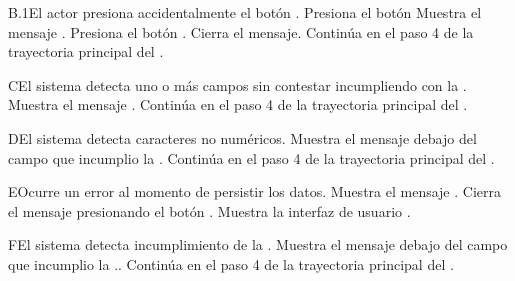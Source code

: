 \begin{UCtrayectoriaA}{B.1}{El actor presiona accidentalmente el botón .}
	\UCpaso[\UCactor] Presiona el botón 
	\UCpaso Muestra el mensaje .
	\UCpaso[\UCactor] Presiona el botón .
	\UCpaso Cierra el mensaje.
	\UCpaso Continúa en el paso 4 de la trayectoria principal del .
\end{UCtrayectoriaA}

\begin{UCtrayectoriaA}{C}{El sistema detecta uno o más campos sin contestar incumpliendo con la .}
	\UCpaso Muestra el mensaje .
	\UCpaso Continúa en el paso 4 de la trayectoria principal del .
\end{UCtrayectoriaA}

\begin{UCtrayectoriaA}{D}{El sistema detecta caracteres no numéricos.}
	\UCpaso Muestra el mensaje  debajo del campo que incumplio la .
	\UCpaso Continúa en el paso 4 de la trayectoria principal del .
\end{UCtrayectoriaA}

\begin{UCtrayectoriaA}{E}{Ocurre un error al momento de persistir los datos.}
	\UCpaso Muestra el mensaje .
    \UCpaso[\UCactor] Cierra el mensaje presionando el botón .
	\UCpaso Muestra la interfaz de usuario .
\end{UCtrayectoriaA}


\begin{UCtrayectoriaA}{F}{El sistema detecta incumplimiento de la .}
	\UCpaso Muestra el mensaje  debajo del campo que incumplio la ..
	\UCpaso Continúa en el paso 4 de la trayectoria principal del .
\end{UCtrayectoriaA}